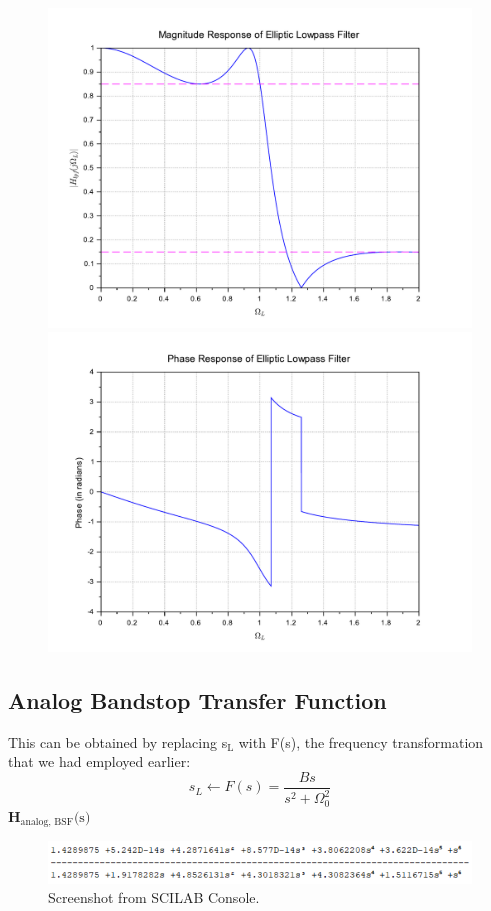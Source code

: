 \documentclass[12pt]{article}
\begin{document}
\begin{figure}[h]
    \begin{minipage}{0.49\linewidth}
        \centering
        \includegraphics[scale=0.36]{mag_lpf_bs.pdf}
    \end{minipage}
    \begin{minipage}{0.49\linewidth}
        \centering
        \includegraphics[scale=0.36]{phase_lpf_bs.pdf}
    \end{minipage}
\end{figure}

\subsection{Analog Bandstop Transfer Function}
This can be obtained by replacing s$_\text{L}$ with F(s), the frequency transformation that we had employed earlier:
\[s_L \leftarrow F(s) = \frac{Bs}{s^2 + \Omega_0^2}\]
\textbf{H$_{\text{analog, BSF}}\text{(s)}$}
\begin{figure}[h]
    \centering
    \includegraphics[width=\textwidth]{h_int_bs.png}
    \caption{Screenshot from SCILAB Console.}
\end{figure}
\end{document}
